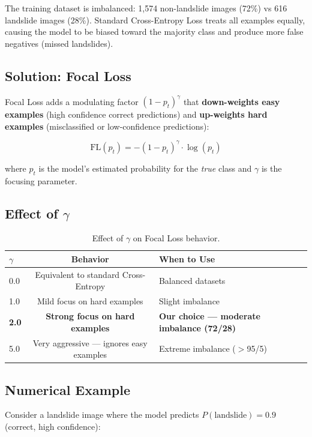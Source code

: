 \documentclass[11pt]{article}
\begin{document}
The training dataset is imbalanced: 1,574 non-landslide images (72\%) vs 616 landslide images (28\%).
Standard Cross-Entropy Loss treats all examples equally, causing the model to be biased toward the majority class and produce more false negatives (missed landslides).

\subsection{Solution: Focal Loss}

Focal Loss adds a modulating factor $(1 - p_t)^\gamma$ that \textbf{down-weights easy examples} (high confidence correct predictions) and \textbf{up-weights hard examples} (misclassified or low-confidence predictions):

\[
\text{FL}(p_t) = -(1 - p_t)^\gamma \cdot \log(p_t)
\]

where $p_t$ is the model's estimated probability for the \emph{true} class and $\gamma$ is the focusing parameter.

\subsection{Effect of $\gamma$}

\begin{table}[H]
\centering
\renewcommand{\arraystretch}{1.2}
\begin{tabular}{lcl}
\toprule
$\gamma$ & \textbf{Behavior} & \textbf{When to Use} \\
\midrule
0.0 & Equivalent to standard Cross-Entropy & Balanced datasets \\
1.0 & Mild focus on hard examples & Slight imbalance \\
\textbf{2.0} & \textbf{Strong focus on hard examples} & \textbf{Our choice --- moderate imbalance (72/28)} \\
5.0 & Very aggressive --- ignores easy examples & Extreme imbalance ($>$95/5) \\
\bottomrule
\end{tabular}
\caption{Effect of $\gamma$ on Focal Loss behavior.}
\end{table}

\subsection{Numerical Example}

Consider a landslide image where the model predicts $P(\text{landslide}) = 0.9$ (correct, high confidence):
\end{document}
